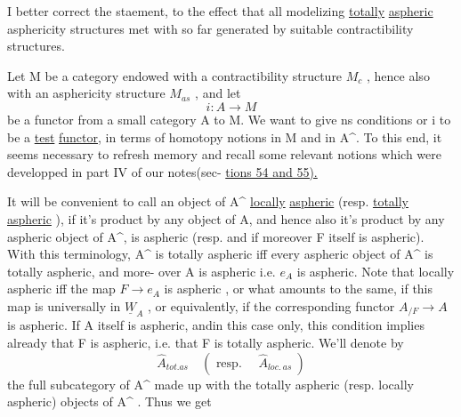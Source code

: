 
I better correct the staement, to the effect that  all modelizing \uline{totally}
\uline{aspheric} asphericity structures met with so far   generated by
suitable contractibility structures.

Let M be a category endowed with a contractibility structure $M_c$ ,
hence also with an asphericity structure $M_{as}$ , and let 
 
\[ i : A \to M \]
be a functor from a small category A to M. We want to give ns conditions
or i to be a \uline{test} \uline{functor}, in terms of homotopy notions in M and in A\^{}.
To this end, it seems necessary to refresh  memory  and recall
some relevant notions which were developped in part IV of our notes(sec-%
\uline{tions 54 and 55).}

It will be convenient to call an object  of A\^{} \uline{locally} \uline{aspheric}
(resp. \uline{totally} \uline{aspheric} ), if it's product  by any object of A, and hence
also it's product by any aspheric object of A\^{}, is aspheric (resp. and
if moreover F itself is aspheric). With this terminology, A\^{} is totally
aspheric iff every aspheric object of A\^{} is totally aspheric, and  more-%
over A is aspheric i.e. $e_{A\hat{}}$ is aspheric.  Note
that   locally aspheric  iff the map $F \to e_{A\hat{}}$ is aspheric ,
or what amounts to the same, if this map is universally in $\underline{W}_A$ , or
equivalently, if the corresponding functor $A_{/F} \to A$ is aspheric.
If A itself is aspheric, and\hand{/}in this case only, this condition implies
already that F is aspheric, i.e. that F is totally aspheric. We'll
denote by 
\[ \hat{A}_{tot.as} \quad ( \text{ resp. } \quad \hat{A}_{loc.\ as} \ ) \]
the full subcategory of A\^{} made up with the totally aspheric (resp.
locally aspheric) objects of A\^{} . Thus we get

